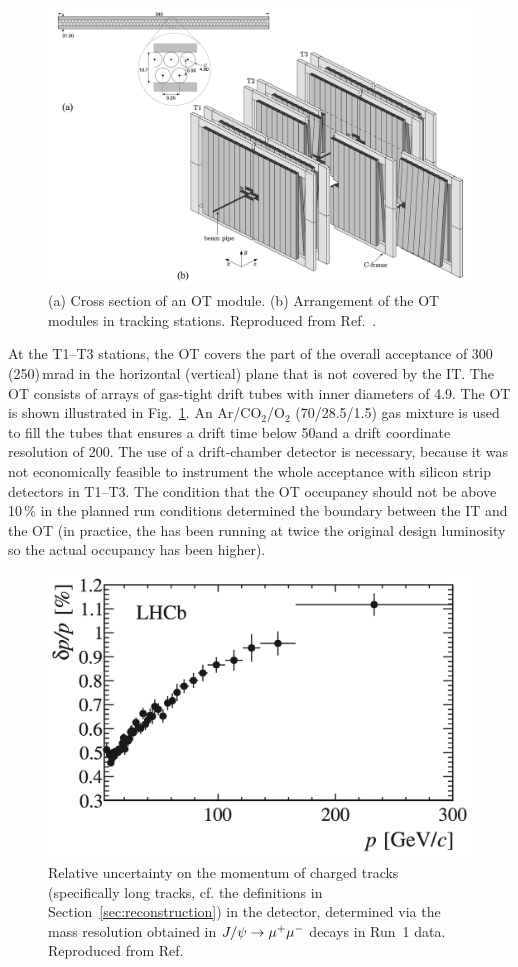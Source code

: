 \begin{figure}[tb]
    \centering
    \includegraphics[width=\columnwidth]{figures/detector/OT_stations.png}
    \caption{(a) Cross section of an OT module. (b) Arrangement of the OT modules in tracking stations. Reproduced from Ref.~\cite{OT-Performance}.}
    \label{fig:OT_station}
\end{figure}

At the T1--T3 stations, the OT covers the part of the overall acceptance of 300 (250)\,mrad in the horizontal (vertical) plane that is not covered by the IT. The OT consists of arrays of gas-tight drift tubes with inner diameters of 4.9\mm. The OT is shown illustrated in Fig.~\ref{fig:OT_station}. An Ar/CO$_2$/O$_2$ (70/28.5/1.5) gas mixture is used to fill the tubes that ensures a drift time below 50\ns and a drift coordinate resolution of 200\mum. The use of a drift-chamber detector is necessary, because it was not economically feasible to instrument the whole \lhcb acceptance with silicon strip detectors in T1--T3. The condition that the OT occupancy should not be above 10\,\% in the planned run conditions determined the boundary between the IT and the OT (in practice, the \lhcb has been running at twice the original design luminosity so the actual occupancy has been higher). 

\begin{figure}[tb]
    \centering
    \includegraphics[width=0.55\columnwidth]{figures/detector/momentum_resolution.png}
    \caption{Relative uncertainty on the momentum of charged tracks (specifically long tracks, cf. the definitions in Section~\ref{sec:reconstruction}) in the \lhcb detector, determined via the mass resolution obtained in $J/\psi\rightarrow{\ensuremath{\mu^+}}\mu^-$ decays in Run~1 data. Reproduced from Ref.~\cite{LHCb-Performance}}
    \label{fig:momentum_resolution}
\end{figure}

